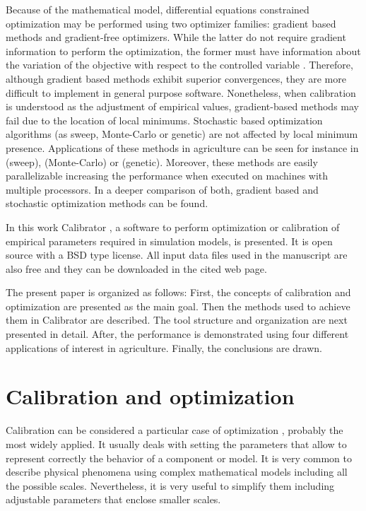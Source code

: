 \documentclass[review,authoryear]{elsarticle}
\begin{document}
Because of the mathematical model, differential equations constrained
optimization may be performed using two optimizer families: gradient based
methods and gradient-free optimizers. While the latter do not require gradient
information to perform the optimization, the former must have information about
the variation of the objective with respect to the controlled variable
\citep{Lacasta15}. Therefore, although gradient based methods exhibit superior
convergences, they are more difficult to implement in general purpose software.
Nonetheless, when calibration is understood as the adjustment of empirical
values, gradient-based methods may fail due to the location of local minimums.
Stochastic based optimization algorithms (as sweep, Monte-Carlo or genetic) are
not affected by local minimum presence. Applications of these methods in
agriculture can be seen for instance in \citet{JaviSurcos2} (sweep),
\citet{Ouazaa15} (Monte-Carlo) or \citet{Ebrahimiam13} (genetic). Moreover,
these methods are easily parallelizable increasing the performance when executed
on machines with multiple processors. In \cite{Lacasta15} a deeper comparison of
both, gradient based and stochastic optimization methods can be found.

In this work Calibrator \citep{CalibratorGit}, a software to perform
optimization or calibration of empirical parameters required in simulation
models, is presented. It is open source with a BSD type license. All input data
files used in the manuscript are also free and they can be downloaded in the
cited web page.

The present paper is organized as follows: First, the concepts of calibration
and optimization are presented as the main goal. Then the methods used to
achieve them in Calibrator are described. The tool structure and organization
are next presented in detail. After, the performance is demonstrated using
four different applications of interest in agriculture. Finally, the conclusions
are drawn.

\section{Calibration and optimization}

Calibration can be considered a particular case of optimization
\citep{WrightNocedal99}, probably the most widely applied. It usually deals with
setting the parameters that allow to represent correctly the behavior of a
component or model. It is very common to describe physical phenomena using
complex mathematical models including all the possible scales. Nevertheless, it
is very useful to simplify them including adjustable parameters that enclose
smaller scales.
\end{document}
